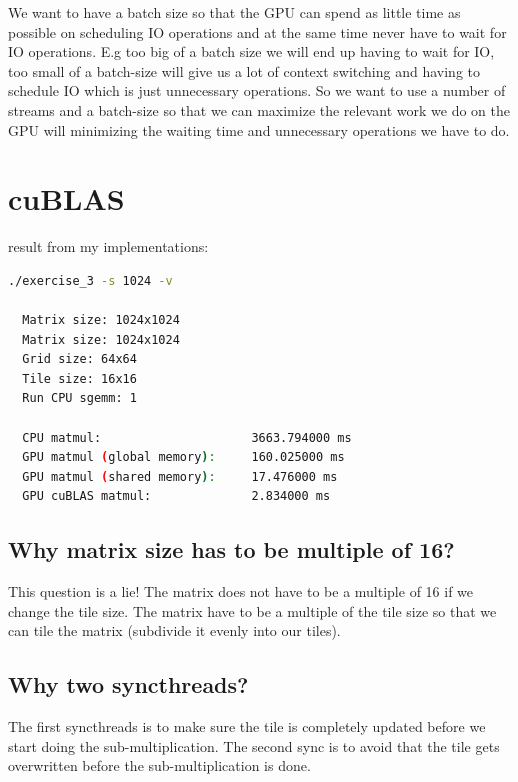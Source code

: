 \documentclass{article}
\begin{document}
We want to have a batch size so that the GPU can spend as little time as possible on scheduling IO operations and at the same time never have to wait for IO operations. E.g too big of a batch size we will end up having to
wait for IO, too small of a batch-size will give us a lot of context switching and having to schedule IO which is just unnecessary operations. So we want to use a number of streams and a batch-size so that we can maximize
the relevant work we do on the GPU will minimizing the waiting time and unnecessary operations we have to do.


\section{cuBLAS}%
\label{sec:cublas}

result from my implementations: 


\begin{mdframed}[backgroundcolor=codeColor,leftmargin=0.0cm,hidealllines=true,%
  innerleftmargin=0.1cm,innerrightmargin=0.1cm,innertopmargin=0.5cm,innerbottommargin=0.10cm,
  roundcorner=15pt]
  \begin{lstlisting}[language=bash]
  ./exercise_3 -s 1024 -v

  Matrix size: 1024x1024
  Matrix size: 1024x1024
  Grid size: 64x64
  Tile size: 16x16
  Run CPU sgemm: 1

  CPU matmul:                     3663.794000 ms
  GPU matmul (global memory):     160.025000 ms
  GPU matmul (shared memory):     17.476000 ms
  GPU cuBLAS matmul:              2.834000 ms
  \end{lstlisting}
\end{mdframed}


\subsection{Why matrix size has to be multiple of 16?}%
\label{sub:why_matrix_size_has_t_obe_multiple_of_16}

This question is a lie! The matrix does not have to be a multiple of 16 if we change the tile size. The matrix have to be a multiple of the tile size
so that we can tile the matrix (subdivide it evenly into our tiles).

\subsection{Why two syncthreads?}%

The first syncthreads is to make sure the tile is completely updated before we start doing the sub-multiplication. The second sync is to avoid that the tile gets overwritten before the sub-multiplication is done.
\end{document}
